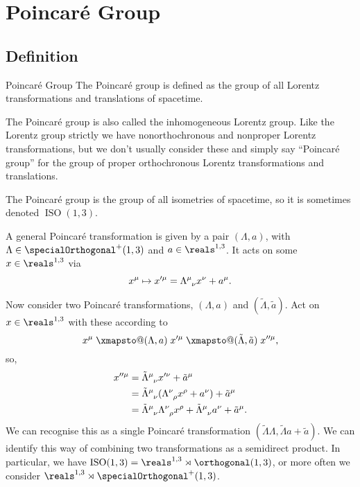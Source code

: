 \documentclass[fleqn]{NotesClass}
\makeatletter
\newcommand{\minkowskiSpace}{\reals^{1,3}}
\renewcommand{\xmapsto}[2][]{\mathrel{\mathpalette\xmapsto@{{#1}{#2}}}}
\newcommand{\xmapsto@}[2]{\xmapsto@@{#1}#2}
\newcommand{\xmapsto@@}[3]{%
    \begingroup
    \sbox\z@{$\m@th#1\mathop{}\limits_{\;#2\;}^{\;#3\;}$}%
    \mathop{\Uhextensible width \wd\z@ 0 "27FC}_{#2}^{#3}%
    \endgroup
}
\DeclareMathOperator{\ISO}{ISO}
\makeatother
\begin{document}
    \chapter{Poincar\'e Group}
    \section{Definition}
    \begin{dfn}{Poincar\'e Group}{}
        The Poincar\'e group is defined as the group of all Lorentz transformations and translations of spacetime.
    \end{dfn}
    
    The Poincar\'e group is also called the inhomogeneous Lorentz group.
    Like the Lorentz group strictly we have nonorthochronous and nonproper Lorentz transformations, but we don't usually consider these and simply say \enquote{Poincar\'e group} for the group of proper orthochronous Lorentz transformations and translations.
    
    The Poincar\'e group is the group of all isometries of spacetime, so it is sometimes denoted \(\ISO(1, 3)\).
    
    A general Poincar\'e transformation is given by a pair \((\Lambda, a)\), with \(\Lambda \in \specialOrthogonal^+(1, 3)\) and \(a \in \minkowskiSpace\).
    It acts on some \(x \in \minkowskiSpace\) via
    \begin{equation}
        x^\mu \mapsto x'^\mu = \tensor{\Lambda}{^\mu_\nu} x^\nu + a^\mu.
    \end{equation}
    
    Now consider two Poincar\'e transformations, \((\Lambda, a)\) and \((\tilde{\Lambda}, \tilde{a})\).
    Act on \(x \in \minkowskiSpace\) with these according to
    \begin{equation}
        x^\mu \xmapsto{(\Lambda, a)} x'^\mu \xmapsto{(\tilde{\Lambda}, \tilde{a})} x''^\mu,
    \end{equation}
    so,
    \begin{align}
        x''^\mu &= \tensor{\tilde{\Lambda}}{^\mu_\nu}x'^\nu + \tilde{a}^\mu\\
        &= \tensor{\tilde{\Lambda}}{^\mu_\nu} (\tensor{\Lambda}{^\nu_\rho} x^\rho + a^\nu) + \tilde{a}^\mu\\
        &= \tensor{\tilde{\Lambda}}{^\mu_\nu} \tensor{\Lambda}{^\nu_\rho} x^\rho + \tensor{\tilde{\Lambda}}{^\mu_\nu}a^\nu + \tilde{a}^\mu.
    \end{align}
    We can recognise this as a single Poincar\'e transformation \((\tilde{\Lambda}\Lambda, \tilde{\Lambda}a + \tilde{a})\).
    We can identify this way of combining two transformations as a semidirect product.
    In particular, we have \(\ISO(1, 3) = \minkowskiSpace \rtimes \orthogonal(1, 3)\), or more often we consider \(\minkowskiSpace \rtimes \specialOrthogonal^+(1, 3)\).
    
\end{document}
